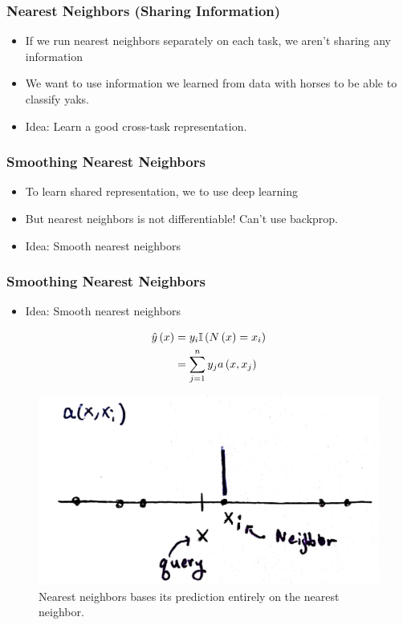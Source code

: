\documentclass[10pt,mathserif]{beamer}
\begin{document}
\begin{frame}
  \frametitle{Nearest Neighbors (Sharing Information)}
 \begin{itemize}
 \item If we run nearest neighbors separately on each task, we aren't sharing
   any information
 \item We want to use information we learned from data with horses to be able to
   classify yaks.
 \item Idea: Learn a good cross-task representation.
 \end{itemize} 
\end{frame}

\begin{frame}[]
  \frametitle{Smoothing Nearest Neighbors}
 \begin{itemize}
 \item To learn shared representation, we to use deep learning
 \item But nearest neighbors is not differentiable! Can't use backprop.
 \item Idea: Smooth nearest neighbors
 \end{itemize} 
\end{frame}

\begin{frame}
  \frametitle{Smoothing Nearest Neighbors}
 \begin{itemize}
 \item Idea: Smooth nearest neighbors
 \end{itemize} 
 \begin{align}
   \hat{y}\left(x\right) &= y_i \mathbb{I}\left({N\left(x\right) = x_i}\right) \\
   &= \sum_{j = 1}^{n} y_j a\left(x, x_j\right)
 \end{align} 
\begin{figure}[ht]
  \centering
  \includegraphics[width=0.7\paperwidth]{figure/hard_a_fun}
  \caption{Nearest neighbors bases its prediction entirely on the nearest
    neighbor. \label{fig:hard_a_fun} }
\end{figure}

\end{frame}
\end{document}

